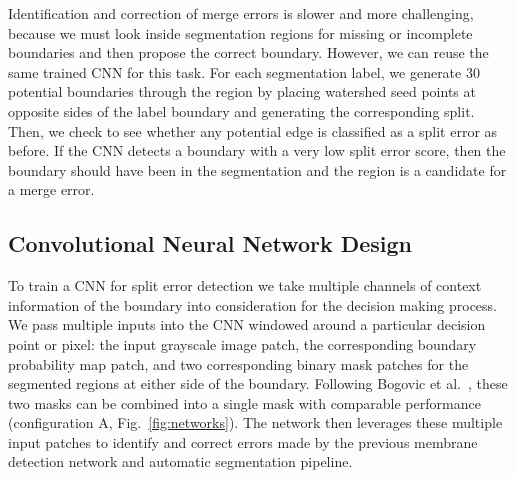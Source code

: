 Identification and correction of merge errors is slower and more challenging, because we must look inside segmentation regions for missing or incomplete boundaries and then propose the correct boundary. However, we can reuse the same trained CNN for this task. For each segmentation label, we generate 30 potential boundaries through the region by placing watershed seed points at opposite sides of the label boundary and generating the corresponding split. Then, we check to see whether any potential edge is classified as a split error as before. If the CNN detects a boundary with a very low split error score, then the boundary should have been in the segmentation and the region is a candidate for a merge error.







\subsection{Convolutional Neural Network Design}
To train a CNN for split error detection we take multiple channels of context information of the boundary into consideration for the decision making process. We pass multiple inputs into the CNN windowed around a particular decision point or pixel: the input grayscale image patch, the corresponding boundary probability map patch, and two corresponding binary mask patches for the segmented regions at either side of the boundary. Following Bogovic et al.~\cite{BogovicHJ13}, these two masks can be combined into a single mask with comparable performance (configuration A, Fig.~\ref{fig:networks}). The network then leverages these multiple input patches to identify and correct errors made by the previous membrane detection network and automatic segmentation pipeline.

